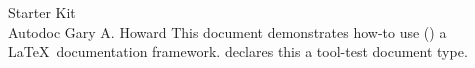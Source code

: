 \documentclass[10pt]{tlc-article}
\begin{document}
  \tlcTitlePageAndTableOfContents
    {Starter Kit \\ Autodoc}
    {Gary A. Howard}
    {This document demonstrates how-to use (\skAutoDoc) a \LaTeX\ documentation
    framework. \skAutoDoc declares this a tool-test document type.}

  

  \makeatletter
  \tlcDebug
  \autodocDebug
  \makeatother
\end{document}
